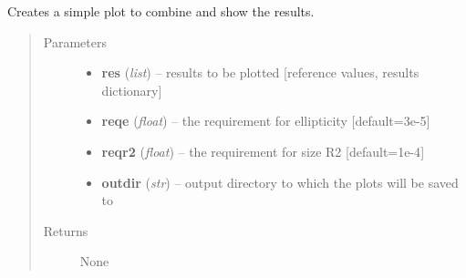 \documentclass[a4paper,11pt,english]{sphinxmanual}
\begin{document}
\begin{fulllineitems}
\label{reduction:analysis.nonlinearityCalibration.plotResults}
Creates a simple plot to combine and show the results.
\begin{quote}\begin{description}
\item[{Parameters}] \leavevmode\begin{itemize}
\item {} 
\textbf{res} (\emph{list}) -- results to be plotted {[}reference values, results dictionary{]}

\item {} 
\textbf{reqe} (\emph{float}) -- the requirement for ellipticity {[}default=3e-5{]}

\item {} 
\textbf{reqr2} (\emph{float}) -- the requirement for size R2 {[}default=1e-4{]}

\item {} 
\textbf{outdir} (\emph{str}) -- output directory to which the plots will be saved to

\end{itemize}

\item[{Returns}] \leavevmode
None

\end{description}\end{quote}

\end{fulllineitems}

\end{document}
